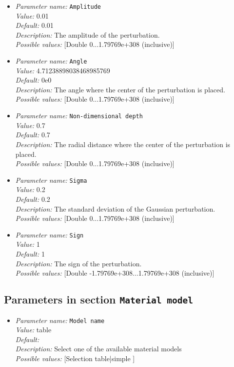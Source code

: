 \begin{itemize}
\item {\it Parameter name:} {\tt Amplitude}\\
{\it Value:} 0.01\\
{\it Default:} 0.01\\
{\it Description:} The amplitude of the perturbation.\\
{\it Possible values:} [Double 0...1.79769e+308 (inclusive)]
\item {\it Parameter name:} {\tt Angle}\\
{\it Value:} 4.71238898038468985769\\
{\it Default:} 0e0\\
{\it Description:} The angle where the center of the perturbation is placed.\\
{\it Possible values:} [Double 0...1.79769e+308 (inclusive)]
\item {\it Parameter name:} {\tt Non-dimensional depth}\\
{\it Value:} 0.7\\
{\it Default:} 0.7\\
{\it Description:} The radial distance where the center of the perturbation is placed.\\
{\it Possible values:} [Double 0...1.79769e+308 (inclusive)]
\item {\it Parameter name:} {\tt Sigma}\\
{\it Value:} 0.2\\
{\it Default:} 0.2\\
{\it Description:} The standard deviation of the Gaussian perturbation.\\
{\it Possible values:} [Double 0...1.79769e+308 (inclusive)]
\item {\it Parameter name:} {\tt Sign}\\
{\it Value:} 1\\
{\it Default:} 1\\
{\it Description:} The sign of the perturbation.\\
{\it Possible values:} [Double -1.79769e+308...1.79769e+308 (inclusive)]
\end{itemize}

\subsection{Parameters in section \tt Material model}

\begin{itemize}
\item {\it Parameter name:} {\tt Model name}\\
{\it Value:} table\\
{\it Default:} \\
{\it Description:} Select one of the available material models\\
{\it Possible values:} [Selection table|simple ]
\end{itemize}



